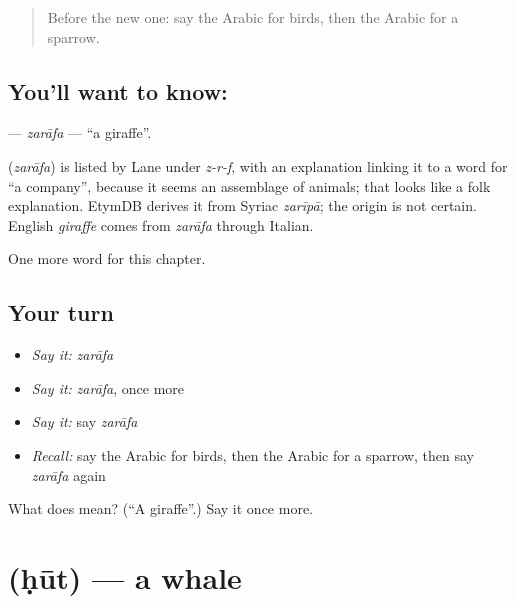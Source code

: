\label{lesson:AR-C276-zarafa}



\begin{quote}
Before the new one: say the Arabic for birds, then the Arabic for a sparrow.
\end{quote}

\subsection*{You'll want to know: }
\textbf{} — \emph{zarāfa} — \textquotedblleft{}a giraffe\textquotedblright{}.

\begin{cousinweb}
\textbf{} (\emph{zarāfa}) is listed by Lane under \emph{z-r-f}, with an explanation linking it to a word for \textquotedblleft{}a company\textquotedblright{}, because it seems an assemblage of animals; that looks like a folk explanation. EtymDB derives it from Syriac \emph{zarīpā}; the origin is not certain. English \emph{giraffe} comes from \emph{zarāfa} through Italian.
\end{cousinweb}

\begin{grammarlens}[title={What you've built}]
One more word for this chapter.
\end{grammarlens}

\subsection*{Your turn}
\begin{itemize}
\raggedright
  \item \emph{Say it:} \emph{zarāfa}
  \item \emph{Say it:} \emph{zarāfa}, once more
  \item \emph{Say it:} say \emph{zarāfa}
  \item \emph{Recall:} say the Arabic for birds, then the Arabic for a sparrow, then say \emph{zarāfa} again
\end{itemize}

\begin{tcolorbox}[breakable,colback=teal!4,colframe=teal!35!black,title={Before you move on}]
What does  mean? (\textquotedblleft{}A giraffe\textquotedblright{}.) Say it once more.
\end{tcolorbox}
\section[\texorpdfstring{\ar{حوت} (ḥūt)}{حوت (ḥūt)}]{ (ḥūt) — a whale}


